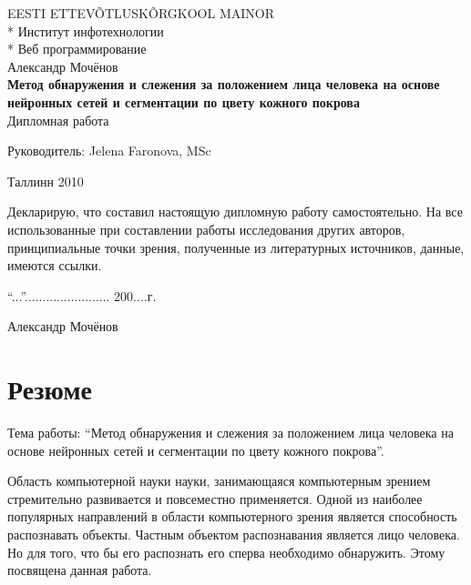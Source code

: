 \documentclass[12pt]{report}
\begin{document}

\begin{titlepage}
  \begin{center}
	\uppercase{Eesti Ettev\~{o}tlusk\~{o}rgkool Mainor}\\*
	Институт инфотехнологии\\*
	Веб программирование\\[8cm]
	Александр Мочёнов\\[1.5cm]
	\large
	\textbf{Метод обнаружения и слежения за положением лица человека на основе нейронных сетей и 
сегментации по цвету кожного покрова}\\[1cm]
	\normalsize
	Дипломная работа\\[2cm]
	\begin{flushright}
		Руководитель: Jelena Faronova, MSc\\[6cm]
	\end{flushright}
	Таллинн 2010
  \end{center}
  
Декларирую, что составил настоящую
дипломную работу самостоятельно.
На все использованные при составлении
работы исследования других авторов,
принципиальные точки зрения,
полученные из литературных источников,
данные, имеются ссылки.
\\[2cm]
\begin{flushright}
``...''........................ 200....г.

Александр Мочёнов
\end{flushright}

\end{titlepage}

\tableofcontents{\thispagestyle{fancyplain}}

\chapter*{Резюме}
\thispagestyle{fancy}

Тема работы: ``Метод обнаружения и слежения за положением лица человека на основе нейронных сетей и 
сегментации по цвету кожного покрова''.

Область компьютерной науки науки, занимающаяся компьютерным зрением стремительно развивается и повсеместно применяется. Одной из наиболее популярных направлений в области компьютерного зрения является способность распознавать объекты. Частным объектом распознавания является лицо человека. Но для того, что бы его распознать его сперва необходимо обнаружить. Этому посвящена данная работа.
\end{document}
